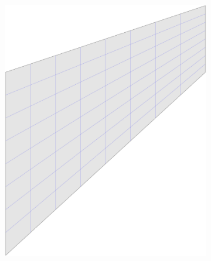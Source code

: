 \documentclass{article}
\begin{document}
\begin{figure}[htb!]
\begin{subfigure}[b]{0.18\linewidth}
    \end{subfigure}
    \begin{subfigure}[b]{0.18\linewidth}        %
        \centering
        \includegraphics[width=\linewidth]{mesh_cook_3}
    \end{subfigure}
    \begin{subfigure}[b]{0.18\linewidth}        %
        \centering

\end{subfigure}
\end{figure}
\end{document}
